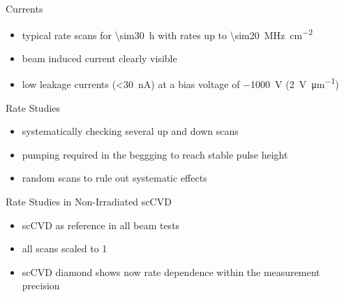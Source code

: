 \begin{frame}{Currents}
 
	\vspace*{-15pt}
	
	\begin{itemize} \itemfill
		\item typical rate scans for \SI{\sim30}{\hour} with rates up to \SI{\sim20}{\mega\hertz\per\centi\meter^2}
		\item beam induced current clearly visible
		\item low leakage currents (\SI{<30}{\nano\ampere}) at a bias voltage of \SI{-1000}{\volt} (\SI{2}{\volt\per\micro m})
	\end{itemize}
 
\end{frame}
\begin{frame}{Rate Studies}

	
	\vspace*{-15pt}
	
	\begin{itemize}
		\item systematically checking several up and down scans
		\item pumping required in the beggging to reach stable pulse height
		\item random scans to rule out systematic effects 
	\end{itemize}
	
\end{frame}
\begin{frame}{Rate Studies in Non-Irradiated scCVD}

	
	\vspace*{-15pt}
	
	\begin{itemize}
		\item scCVD as reference in all beam tests
		\item all scans scaled to 1
		\item scCVD diamond shows now rate dependence within the measurement precision
	\end{itemize}
	
\end{frame}
